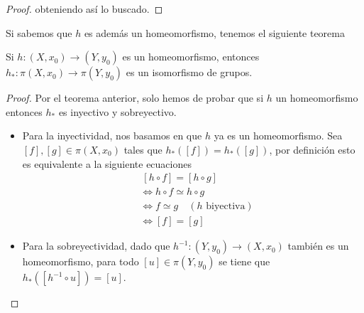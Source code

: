 {\begin{proof}
  obteniendo así lo buscado.
\end{proof}
Si sabemos que \(h\) es además un homeomorfismo, tenemos el siguiente
teorema
\begin{teorema} \label{thm:homoemorfismo-isomorfismo}
Si \(h : (X, x_0) \to (Y,y_0)\) es un homeomorfismo, entonces \(h_{*} :
\pi (X, x_0) \to \pi (Y, y_0)\) es un isomorfismo de grupos.
\end{teorema}
\begin{proof}
Por el teorema anterior, solo hemos de probar que si \(h\) un
homeomorfismo entonces \(h_*\) es inyectivo y sobreyectivo.
\begin{itemize}
  \item Para la inyectividad, nos basamos en que \(h\) ya es un
  homeomorfismo. Sea \([f], [g] \in \pi (X, x_0)\) tales que \(h_* ([f])
  = h_* ([g])\), por definición esto es equivalente a la siguiente
  ecuaciones
  \begin{align*}
    &~ [h \circ f] = [h \circ g] \\
    &\iff h \circ f \simeq h \circ g \\
    &\iff f \simeq g \quad (h \text{ biyectiva}) \\
    &\iff [f] = [g]
  \end{align*}

  \item Para la sobreyectividad, dado que \(h^{-1} :
  (Y,y_0) \to (X, x_0)\) también es un homeomorfismo, para todo \([u] \in
  \pi (Y, y_0) \) se tiene que \(h_{*} ([h^{-1} \circ u]) = [u]\).
\end{itemize}
\end{proof}

}
